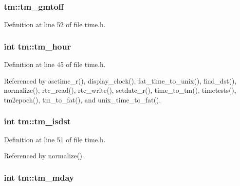 \subsubsection[{\texorpdfstring{tm\+\_\+gmtoff}{tm_gmtoff}}]{ tm\+::tm\+\_\+gmtoff}\hypertarget{structtm_a6b7d1fb16f21197ea027e364e2812c3d}{}\label{structtm_a6b7d1fb16f21197ea027e364e2812c3d}


Definition at line 52 of file time.\+h.

\subsubsection[{\texorpdfstring{tm\+\_\+hour}{tm_hour}}]{\setlength{\rightskip}{0pt plus 5cm}int tm\+::tm\+\_\+hour}\hypertarget{structtm_a3e7ca4e37f1abcaf56b8a916c38eb9fe}{}\label{structtm_a3e7ca4e37f1abcaf56b8a916c38eb9fe}


Definition at line 45 of file time.\+h.



Referenced by asctime\+\_\+r(), display\+\_\+clock(), fat\+\_\+time\+\_\+to\+\_\+unix(), find\+\_\+dst(), normalize(), rtc\+\_\+read(), rtc\+\_\+write(), setdate\+\_\+r(), time\+\_\+to\+\_\+tm(), timetests(), tm2epoch(), tm\+\_\+to\+\_\+fat(), and unix\+\_\+time\+\_\+to\+\_\+fat().

\subsubsection[{\texorpdfstring{tm\+\_\+isdst}{tm_isdst}}]{\setlength{\rightskip}{0pt plus 5cm}int tm\+::tm\+\_\+isdst}\hypertarget{structtm_a5645ca0580c8ab2c24f6c2965d9c9f9c}{}\label{structtm_a5645ca0580c8ab2c24f6c2965d9c9f9c}


Definition at line 51 of file time.\+h.



Referenced by normalize().

\subsubsection[{\texorpdfstring{tm\+\_\+mday}{tm_mday}}]{\setlength{\rightskip}{0pt plus 5cm}int tm\+::tm\+\_\+mday}\hypertarget{structtm_ab8d8904bad43b0c8b96e61941c5b5310}{}\label{structtm_ab8d8904bad43b0c8b96e61941c5b5310}


